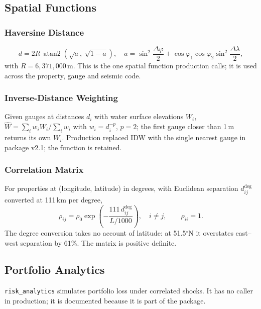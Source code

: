 \documentclass[11pt,a4paper]{article}
\begin{document}
\subsection{Spatial Functions}
\label{sec:spatial}

\subsubsection{Haversine Distance}
\begin{equation}
    d = 2R\,\operatorname{atan2}\!\left(\sqrt{a},\ \sqrt{1-a}\right),\quad
    a = \sin^2\frac{\Delta\varphi}{2} + \cos\varphi_1\cos\varphi_2\sin^2\frac{\Delta\lambda}{2},
    \label{eq:haversine}
\end{equation}
with $R=6{,}371{,}000$\,m. This is the one spatial function production calls; it is
used across the property, gauge and seismic code.

\subsubsection{Inverse-Distance Weighting}
Given gauges at distances $d_i$ with water surface elevations $W_i$,
$\hat W=\sum_i w_iW_i/\sum_iw_i$ with $w_i=d_i^{-p}$, $p=2$; the first gauge closer than
1\,m returns its own $W_i$. Production replaced IDW with the single nearest gauge in
package v2.1; the function is retained.

\subsubsection{Correlation Matrix}
For properties at (longitude, latitude) in degrees, with Euclidean separation
$d^{\deg}_{ij}$ converted at 111\,km per degree,
\begin{equation}
    \rho_{ij} = \rho_0 \exp\!\left(-\frac{111\, d^{\deg}_{ij}}{L/1000}\right),\quad i\ne j,
    \qquad \rho_{ii}=1.
    \label{eq:corr}
\end{equation}
The degree conversion takes no account of latitude: at 51.5$^\circ$N it overstates
east--west separation by 61\%. The matrix is positive definite.

\subsection{Portfolio Analytics}
\label{sec:portfolio}

\texttt{risk\_analytics} simulates portfolio loss under correlated shocks. It has no
caller in production; it is documented because it is part of the package.
\end{document}
